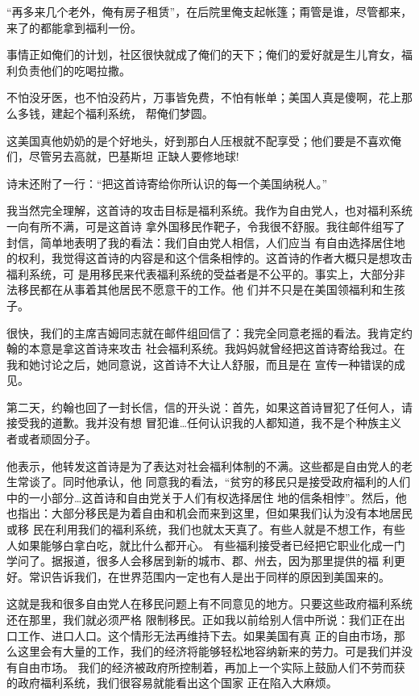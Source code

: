 ﻿\documentclass[11pt]{article}
\begin{document}
``再多来几个老外，俺有房子租赁''，在后院里俺支起帐篷；甭管是谁，尽管都来，来了的都能拿到福利一份。

事情正如俺们的计划，社区很快就成了俺们的天下；俺们的爱好就是生儿育女，福利负责他们的吃喝拉撒。

不怕没牙医，也不怕没药片，万事皆免费，不怕有帐单；美国人真是傻啊，花上那么多钱，建起个福利系统，
帮俺们梦圆。

这美国真他奶奶的是个好地头，好到那白人压根就不配享受；他们要是不喜欢俺们，尽管另去高就，巴基斯坦
正缺人要修地球!

诗末还附了一行：``把这首诗寄给你所认识的每一个美国纳税人。''

我当然完全理解，这首诗的攻击目标是福利系统。我作为自由党人，也对福利系统一向有所不满，可是这首诗
拿外国移民作靶子，令我很不舒服。我往邮件组写了封信，简单地表明了我的看法：我们自由党人相信，人们应当
有自由选择居住地的权利，我觉得这首诗的内容是和这个信条相悖的。这首诗的作者大概只是想攻击福利系统，可
是用移民来代表福利系统的受益者是不公平的。事实上，大部分非法移民都在从事着其他居民不愿意干的工作。他
们并不只是在美国领福利和生孩子。

很快，我们的主席吉姆同志就在邮件组回信了：我完全同意老摇的看法。我肯定约翰的本意是拿这首诗来攻击
社会福利系统。我妈妈就曾经把这首诗寄给我过。在我和她讨论之后，她同意说，这首诗不大让人舒服，而且是在
宣传一种错误的成见。

第二天，约翰也回了一封长信，信的开头说：首先，如果这首诗冒犯了任何人，请接受我的道歉。我并没有想
冒犯谁\ldots 任何认识我的人都知道，我不是个种族主义者或者顽固分子。

他表示，他转发这首诗是为了表达对社会福利体制的不满。这些都是自由党人的老生常谈了。同时他承认，他
同意我的看法，``贫穷的移民只是接受政府福利的人们中的一小部分\ldots 这首诗和自由党关于人们有权选择居住
地的信条相悖''。然后，他也指出：大部分移民是为着自由和机会而来到这里，但如果我们认为没有本地居民或移
民在利用我们的福利系统，我们也就太天真了。有些人就是不想工作，有些人如果能够白拿白吃，就比什么都开心。
有些福利接受者已经把它职业化成一门学问了。据报道，很多人会移居到新的城市、郡、州去，因为那里提供的福
利更好。常识告诉我们，在世界范围内一定也有人是出于同样的原因到美国来的。

这就是我和很多自由党人在移民问题上有不同意见的地方。只要这些政府福利系统还在那里，我们就必须严格
限制移民。正如我以前给别人信中所说：我们正在出口工作、进口人口。这个情形无法再维持下去。如果美国有真
正的自由市场，那么这里会有大量的工作，我们的经济将能够轻松地容纳新来的劳力。可是我们并没有自由市场。
我们的经济被政府所控制着，再加上一个实际上鼓励人们不劳而获的政府福利系统，我们很容易就能看出这个国家
正在陷入大麻烦。
\end{document}
